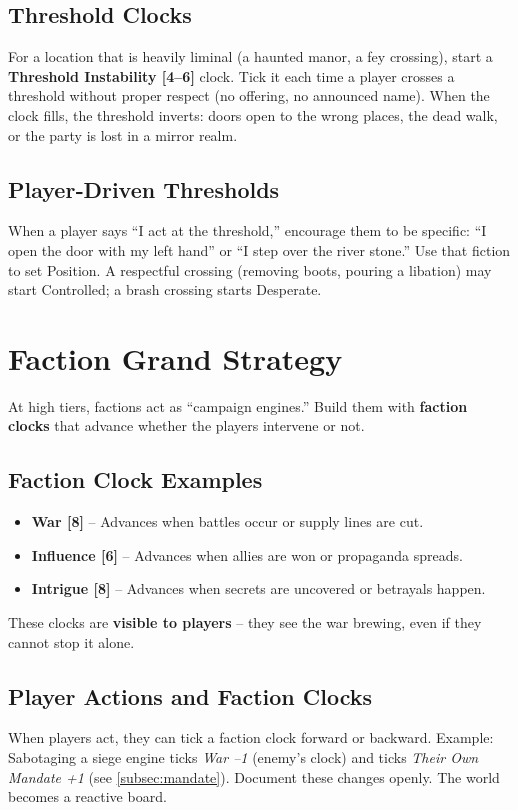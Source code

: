 \subsection*{Threshold Clocks}
For a location that is heavily liminal (a haunted manor, a fey crossing), start a \textbf{Threshold Instability [4–6]} clock. Tick it each time a player crosses a threshold without proper respect (no offering, no announced name). When the clock fills, the threshold inverts: doors open to the wrong places, the dead walk, or the party is lost in a mirror realm.

\subsection*{Player‑Driven Thresholds}
When a player says “I act at the threshold,” encourage them to be specific: “I open the door with my left hand” or “I step over the river stone.” Use that fiction to set Position. A respectful crossing (removing boots, pouring a libation) may start Controlled; a brash crossing starts Desperate.

\section{Faction Grand Strategy}

At high tiers, factions act as “campaign engines.” Build them with \textbf{faction clocks} that advance whether the players intervene or not.

\subsection*{Faction Clock Examples}
\begin{itemize}
  \item \textbf{War [8]} – Advances when battles occur or supply lines are cut.
  \item \textbf{Influence [6]} – Advances when allies are won or propaganda spreads.
  \item \textbf{Intrigue [8]} – Advances when secrets are uncovered or betrayals happen.
\end{itemize}
These clocks are \textbf{visible to players} – they see the war brewing, even if they cannot stop it alone.

\subsection*{Player Actions and Faction Clocks}
When players act, they can tick a faction clock forward or backward. Example: Sabotaging a siege engine ticks \emph{War –1} (enemy’s clock) and ticks \emph{Their Own Mandate +1} (see \ref{subsec:mandate}). Document these changes openly. The world becomes a reactive board.

